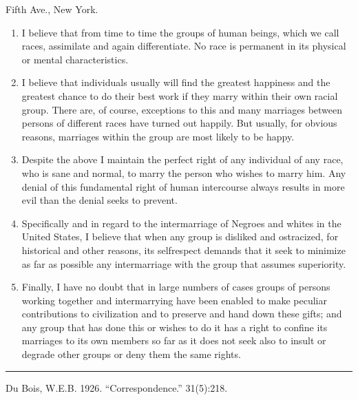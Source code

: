 \documentclass[letterpaper,10pt,english]{jupyterBook}
\begin{document}
 Fifth Ave., New York.
\begin{enumerate}
%
\item {} 
\sphinxAtStartPar
I believe that from time to time the groups of human beings, which we call races, assimilate and again differentiate. No race is permanent in its physical or mental characteristics.

\item {} 
\sphinxAtStartPar
I believe that individuals usually will find the greatest happiness and the greatest chance to do their best work if they marry within their own racial group. There are, of course, exceptions to this and many marriages between persons of different races have turned out happily. But usually, for obvious reasons, marriages within the group are most likely to be happy.

\item {} 
\sphinxAtStartPar
Despite the above I maintain the perfect right of any individual of any race, who is sane and normal, to marry the person who wishes to marry him. Any denial of this fundamental right of human intercourse always results in more evil than the denial seeks to prevent.

\item {} 
\sphinxAtStartPar
Specifically and in regard to the intermarriage of Negroes and whites in the United States, I believe that when any group is disliked and ostracized, for historical and other reasons, its self\sphinxhyphen{}respect demands that it seek to minimize as far as possible any intermarriage with the group that assumes superiority.

\item {} 
\sphinxAtStartPar
Finally, I have no doubt that in large numbers of cases groups of persons working together and intermarrying have been enabled to make peculiar contributions to civilization and to preserve and hand down these gifts; and any group that has done this or wishes to do it has a right to confine its marriages to its own members so far as it does not seek also to insult or degrade other groups or deny them the same rights.

\end{enumerate}

\sphinxAtStartPar
{}


\bigskip\hrule\bigskip


\sphinxAtStartPar
{} Du Bois, W.E.B. 1926. “Correspondence.”  31(5):218.
\end{document}
